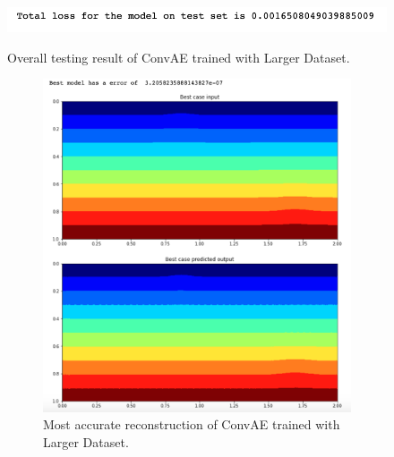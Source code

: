 \begin{figure}[H]
    \caption{Overall testing result of ConvAE trained with Larger Dataset.}
    \includegraphics[scale=0.8]{figures/mantle_convection_images/larger_dataset/ConvAE_OverallTesting.png}
    \label{figure:ConvAE_larger_testing}
\end{figure}

\begin{figure}[H]
\centering
\begin{subfigure}{0.45\textwidth}
    \includegraphics[width=\textwidth]{figures/mantle_convection_images/larger_dataset/ConvAE_Best.png}
    \caption{Most accurate reconstruction of ConvAE trained with Larger Dataset.}
\end{subfigure}
\hfill
\begin{subfigure}{0.45\textwidth}

\end{subfigure}
\end{figure}
